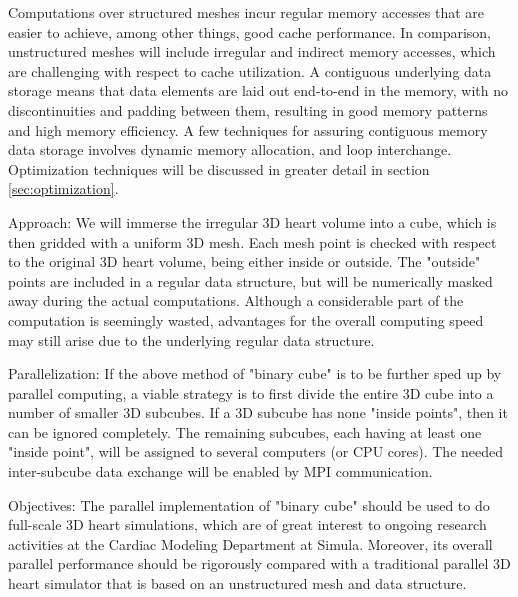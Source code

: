 Computations over structured meshes incur regular memory accesses that are easier to achieve, among other things, good cache performance. In comparison, unstructured meshes will include irregular and indirect memory accesses, which are challenging with respect to cache utilization.
A contiguous underlying data storage means that data elements are laid out end-to-end in the memory, with no discontinuities and padding between them, resulting in good memory patterns and high memory efficiency. A few techniques for assuring contiguous memory data storage involves dynamic memory allocation, and loop interchange. Optimization techniques will be discussed in greater detail in section \ref{sec:optimization}. 


Approach: We will immerse the irregular 3D heart volume into a cube, which is then gridded with a uniform 3D mesh. Each mesh point is checked with respect to the original 3D heart volume, being either inside or outside. The "outside" points are included in a regular data structure, but will be numerically masked away during the actual computations. Although a considerable part of the computation is seemingly wasted, advantages for the overall computing speed may still arise due to the underlying regular data structure.

Parallelization: If the above method of "binary cube" is to be further sped up by parallel computing, a viable strategy is to first divide the entire 3D cube into a number of smaller 3D subcubes. If a 3D subcube has none "inside points", then it can be ignored completely. The remaining subcubes, each having at least one "inside point", will be assigned to several computers (or CPU cores). The needed inter-subcube data exchange will be enabled by MPI communication.

Objectives: The parallel implementation of "binary cube" should be used to do full-scale 3D heart simulations, which are of great interest to ongoing research activities at the Cardiac Modeling Department at Simula. Moreover, its overall parallel performance should be rigorously compared with a traditional parallel 3D heart simulator that is based on an unstructured mesh and data structure.



